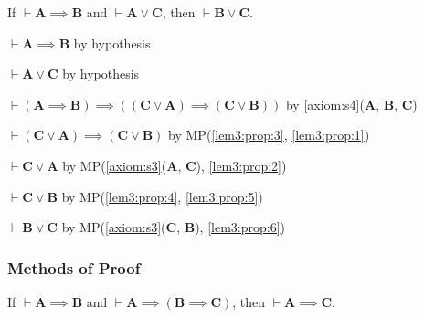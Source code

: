 \documentclass{amsart}%
\newcommand\metavariable[1]{\boldsymbol{#1}}
\begin{document}
\begin{lemma}\label{lem3:prop}
If $\vdash\metavariable{A}\implies\metavariable{B}$
and $\vdash\metavariable{A}\lor\metavariable{C}$,
then $\vdash\metavariable{B}\lor\metavariable{C}$.
\end{lemma}
\begin{pf}
\item\label{lem3:prop:1} $\vdash\metavariable{A}\implies\metavariable{B}$ by hypothesis
\item\label{lem3:prop:2} $\vdash\metavariable{A}\lor\metavariable{C}$ by hypothesis
\item\label{lem3:prop:3} $\vdash(\metavariable{A}\implies\metavariable{B})\implies((\metavariable{C}\lor\metavariable{A})\implies(\metavariable{C}\lor\metavariable{B}))$
  by \ref{axiom:s4}($\metavariable{A}$, $\metavariable{B}$, $\metavariable{C}$)
\item\label{lem3:prop:4} $\vdash(\metavariable{C}\lor\metavariable{A})\implies(\metavariable{C}\lor\metavariable{B})$
  by MP(\ref{lem3:prop:3}, \ref{lem3:prop:1})
\item\label{lem3:prop:5} $\vdash\metavariable{C}\lor\metavariable{A}$ by MP(\ref{axiom:s3}($\metavariable{A}$, $\metavariable{C}$), \ref{lem3:prop:2})
\item\label{lem3:prop:6} $\vdash\metavariable{C}\lor\metavariable{B}$
  by MP(\ref{lem3:prop:4}, \ref{lem3:prop:5})
\item\label{lem3:prop:7} $\vdash\metavariable{B}\lor\metavariable{C}$
  by MP(\ref{axiom:s3}($\metavariable{C}$, $\metavariable{B}$), \ref{lem3:prop:6})
\end{pf}



\subsubsection{Methods of Proof}

\begin{lemma}\label{lm:prop:hs}
If $\vdash\metavariable{A}\implies\metavariable{B}$
and $\vdash\metavariable{A}\implies(\metavariable{B}\implies\metavariable{C})$,
then $\vdash\metavariable{A}\implies\metavariable{C}$.
\end{lemma}
\end{document}
